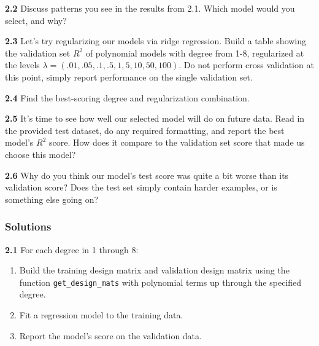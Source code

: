 \documentclass[11pt]{article}
\begin{document}
\textbf{2.2} Discuss patterns you see in the results from 2.1. Which
model would you select, and why?

\textbf{2.3} Let's try regularizing our models via ridge regression.
Build a table showing the validation set \(R^2\) of polynomial models
with degree from 1-8, regularized at the levels
\(\lambda = (.01, .05, .1,.5, 1, 5, 10, 50, 100)\). Do not perform cross
validation at this point, simply report performance on the single
validation set.

\textbf{2.4} Find the best-scoring degree and regularization
combination.

\textbf{2.5} It's time to see how well our selected model will do on
future data. Read in the provided test dataset, do any required
formatting, and report the best model's \(R^2\) score. How does it
compare to the validation set score that made us choose this model?

\textbf{2.6} Why do you think our model's test score was quite a bit
worse than its validation score? Does the test set simply contain harder
examples, or is something else going on?

    \subsubsection{Solutions}\label{solutions}

    \textbf{2.1} For each degree in 1 through 8:

\begin{enumerate}
\def\labelenumi{\arabic{enumi}.}
\item
  Build the training design matrix and validation design matrix using
  the function \texttt{get\_design\_mats} with polynomial terms up
  through the specified degree.
\item
  Fit a regression model to the training data.
\item
  Report the model's score on the validation data.
\end{enumerate}
\end{document}
